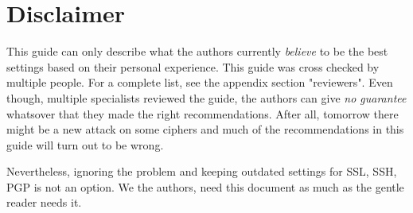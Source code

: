 \section{Disclaimer}
This guide can only describe what the authors currently \emph{believe} to be the best settings based on their personal experience. This guide was cross checked by multiple people. For a complete list, see the appendix section "reviewers". Even though, multiple specialists reviewed the guide, the authors can give \emph{no guarantee} whatsover that they made the right recommendations. After all, tomorrow there might be a new attack on some ciphers and much of the recommendations in this guide will turn out to be wrong.


Nevertheless, ignoring the problem and keeping outdated settings for SSL, SSH, PGP is not an option. We the authors, need this document as much as the gentle reader needs it.


